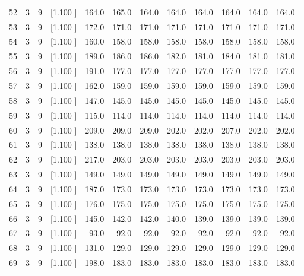 \documentclass[12pt,a4paper]{article}
\begin{document}
\begin{center}
{\begin{tabular}{r r r r r r r r r r r r}
  52&  3&  9&[1.100     ]&   164.0&   165.0&   164.0&   164.0&   164.0&   164.0&   164.0&   164.0\\[-0.02in]
  53&  3&  9&[1.100     ]&   172.0&   171.0&   171.0&   171.0&   171.0&   171.0&   171.0&   171.0\\[-0.02in]
  54&  3&  9&[1.100     ]&   160.0&   158.0&   158.0&   158.0&   158.0&   158.0&   158.0&   158.0\\[-0.02in]
  55&  3&  9&[1.100     ]&   189.0&   186.0&   186.0&   182.0&   181.0&   184.0&   181.0&   181.0\\[-0.02in]
  56&  3&  9&[1.100     ]&   191.0&   177.0&   177.0&   177.0&   177.0&   177.0&   177.0&   177.0\\[-0.02in]
  57&  3&  9&[1.100     ]&   162.0&   159.0&   159.0&   159.0&   159.0&   159.0&   159.0&   159.0\\[-0.02in]
  58&  3&  9&[1.100     ]&   147.0&   145.0&   145.0&   145.0&   145.0&   145.0&   145.0&   145.0\\[-0.02in]
  59&  3&  9&[1.100     ]&   115.0&   114.0&   114.0&   114.0&   114.0&   114.0&   114.0&   114.0\\[-0.02in]
  60&  3&  9&[1.100     ]&   209.0&   209.0&   209.0&   202.0&   202.0&   207.0&   202.0&   202.0\\[-0.02in]
  61&  3&  9&[1.100     ]&   138.0&   138.0&   138.0&   138.0&   138.0&   138.0&   138.0&   138.0\\[-0.02in]
  62&  3&  9&[1.100     ]&   217.0&   203.0&   203.0&   203.0&   203.0&   203.0&   203.0&   203.0\\[-0.02in]
  63&  3&  9&[1.100     ]&   149.0&   149.0&   149.0&   149.0&   149.0&   149.0&   149.0&   149.0\\[-0.02in]
  64&  3&  9&[1.100     ]&   187.0&   173.0&   173.0&   173.0&   173.0&   173.0&   173.0&   173.0\\[-0.02in]
  65&  3&  9&[1.100     ]&   176.0&   175.0&   175.0&   175.0&   175.0&   175.0&   175.0&   175.0\\[-0.02in]
  66&  3&  9&[1.100     ]&   145.0&   142.0&   142.0&   140.0&   139.0&   139.0&   139.0&   139.0\\[-0.02in]
  67&  3&  9&[1.100     ]&    93.0&    92.0&    92.0&    92.0&    92.0&    92.0&    92.0&    92.0\\[-0.02in]
  68&  3&  9&[1.100     ]&   131.0&   129.0&   129.0&   129.0&   129.0&   129.0&   129.0&   129.0\\[-0.02in]
  69&  3&  9&[1.100     ]&   198.0&   183.0&   183.0&   183.0&   183.0&   183.0&   183.0&   183.0\\[-0.02in]

\end{tabular}}
\end{center}
\end{document}
